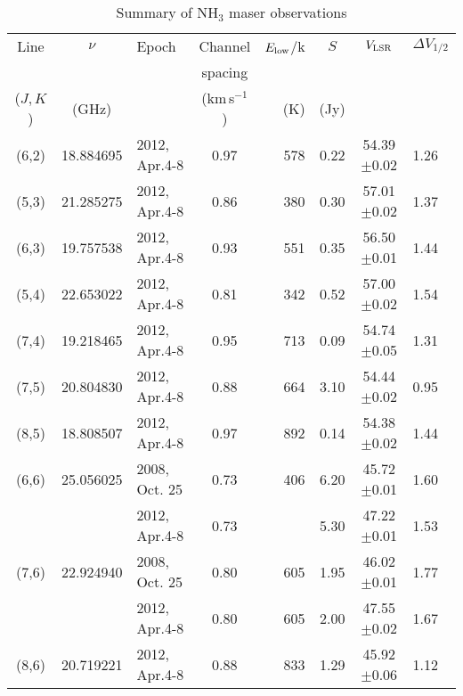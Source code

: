 \documentclass[oldversion]{aa}
\begin{document}
\begin{table*}
\label{tab1}
\caption[]{Summary of NH$_3$ maser observations}
\begin{flushleft}
\begin{tabular}{cclcrccl}
\hline
Line      &  $\nu$    &  Epoch        & Channel        & $E_{\rm low}$/k & $S$   & $V_{\rm LSR}$  & $\Delta V_{1/2}$ \\
          &           &               & spacing        &                 &       &                &                  \\
($J,K$)   &  (GHz)    &               & (km\,s$^{-1}$) &    (K)          & (Jy)  &                &  \\
\hline 
  (6,2)   & 18.884695 & 2012, Apr.4-8 &  0.97          &   578           & 0.22  & 54.39$\pm$0.02 & 1.26             \\
  (5,3)   & 21.285275 & 2012, Apr.4-8 &  0.86          &   380           & 0.30  & 57.01$\pm$0.02 & 1.37             \\
  (6,3)   & 19.757538 & 2012, Apr.4-8 &  0.93          &   551           & 0.35  & 56.50$\pm$0.01 & 1.44             \\
  (5,4)   & 22.653022 & 2012, Apr.4-8 &  0.81          &   342           & 0.52  & 57.00$\pm$0.02 & 1.54             \\
  (7,4)   & 19.218465 & 2012, Apr.4-8 &  0.95          &   713           & 0.09  & 54.74$\pm$0.05 & 1.31             \\
  (7,5)   & 20.804830 & 2012, Apr.4-8 &  0.88          &   664           & 3.10  & 54.44$\pm$0.02 & 0.95             \\
  (8,5)   & 18.808507 & 2012, Apr.4-8 &  0.97          &   892           & 0.14  & 54.38$\pm$0.02 & 1.44             \\
  (6,6)   & 25.056025 & 2008, Oct. 25 &  0.73          &   406           & 6.20  & 45.72$\pm$0.01 & 1.60             \\
          &           & 2012, Apr.4-8 &  0.73          &                 & 5.30  & 47.22$\pm$0.01 & 1.53             \\
  (7,6)   & 22.924940 & 2008, Oct. 25 &  0.80          &   605           & 1.95  & 46.02$\pm$0.01 & 1.77             \\
          &           & 2012, Apr.4-8 &  0.80          &   605           & 2.00  & 47.55$\pm$0.02 & 1.67             \\
  (8,6)   & 20.719221 & 2012, Apr.4-8 &  0.88          &   833           & 1.29  & 45.92$\pm$0.06 & 1.12             \\

\end{tabular}
\end{flushleft}
\end{table*}
\end{document}
